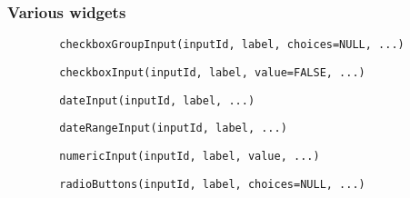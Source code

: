 \documentclass{beamer}
\begin{document}
	\begin{frame}[fragile]
		\frametitle{Various widgets}

		\begin{exampleblock}{}
		\begin{BVerbatim}
		checkboxGroupInput(inputId, label, choices=NULL, ...)
		\end{BVerbatim}
		\end{exampleblock}{}

		\vspace{1em}

		\begin{exampleblock}{}
		\begin{BVerbatim}
		checkboxInput(inputId, label, value=FALSE, ...)
		\end{BVerbatim}
		\end{exampleblock}{}

		\vspace{1em}

		\begin{exampleblock}{}
		\begin{BVerbatim}
		dateInput(inputId, label, ...)
		\end{BVerbatim}
		\end{exampleblock}{}

		\vspace{1em}

		\begin{exampleblock}{}
		\begin{BVerbatim}
		dateRangeInput(inputId, label, ...)
		\end{BVerbatim}
		\end{exampleblock}{}

		\vspace{1em}

		\begin{exampleblock}{}
		\begin{BVerbatim}
		numericInput(inputId, label, value, ...)
		\end{BVerbatim}
		\end{exampleblock}{}

		\vspace{1em}

		\begin{exampleblock}{}
		\begin{BVerbatim}
		radioButtons(inputId, label, choices=NULL, ...)
		\end{BVerbatim}
		\end{exampleblock}{}

	\end{frame}
\end{document}
